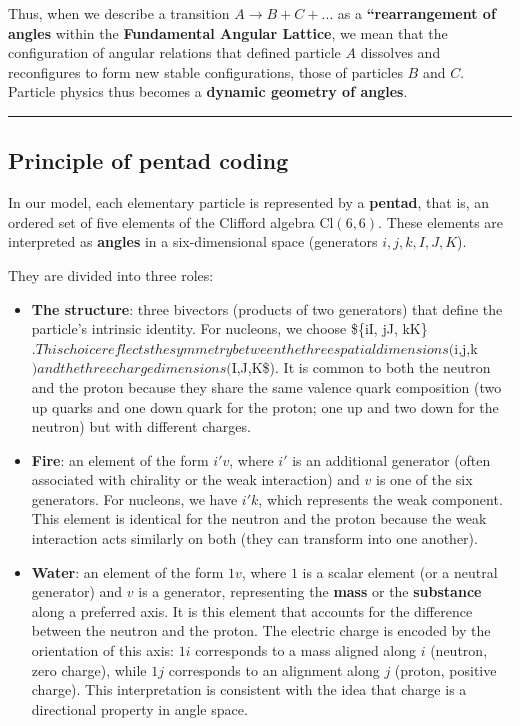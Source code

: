 \documentclass[11pt]{article}
\providecommand{\tightlist}{%
\setlength{\itemsep}{2pt}\setlength{\parskip}{6pt}
}
\begin{document}
Thus, when we describe a transition \(A \to B + C + \dots\) as a
\textbf{``rearrangement of angles} within the \textbf{Fundamental
Angular Lattice}, we mean that the configuration of angular relations
that defined particle \(A\) dissolves and reconfigures to form new
stable configurations, those of particles \(B\) and \(C\). Particle
physics thus becomes a \textbf{dynamic geometry of angles}.

\begin{center}\rule{0.5\linewidth}{0.5pt}\end{center}

\hypertarget{principle-of-pentad-coding}{%
\subsection{Principle of pentad
coding}\label{principle-of-pentad-coding}}

In our model, each elementary particle is represented by a
\textbf{pentad}, that is, an ordered set of five elements of the
Clifford algebra \(\text{Cl}(6,6)\). These elements are interpreted as
\textbf{angles} in a six-dimensional space (generators \(i,j,k,I,J,K\)).

They are divided into three roles:

\begin{itemize}
\tightlist
\item
  \textbf{The structure}: three bivectors (products of two generators)
  that define the particle's intrinsic identity. For nucleons, we choose
  \$\{iI, jJ, kK\}
  \(. This choice reflects the symmetry between the three spatial dimensions (\)i,j,k\() and the three charge dimensions (\)I,J,K\$).
  It is common to both the neutron and the proton because they share the
  same valence quark composition (two up quarks and one down quark for
  the proton; one up and two down for the neutron) but with different
  charges.
\item
  \textbf{Fire}: an element of the form \(i'v\), where \(i'\) is an
  additional generator (often associated with chirality or the weak
  interaction) and \(v\) is one of the six generators. For nucleons, we
  have \(i'k\), which represents the weak component. This element is
  identical for the neutron and the proton because the weak interaction
  acts similarly on both (they can transform into one another).
\item
  \textbf{Water}: an element of the form \(1v\), where \(1\) is a scalar
  element (or a neutral generator) and \(v\) is a generator,
  representing the \textbf{mass} or the \textbf{substance} along a
  preferred axis. It is this element that accounts for the difference
  between the neutron and the proton. The electric charge is encoded by
  the orientation of this axis: \(1i\) corresponds to a mass aligned
  along \(i\) (neutron, zero charge), while \(1j\) corresponds to an
  alignment along \(j\) (proton, positive charge). This interpretation
  is consistent with the idea that charge is a directional property in
  angle space.
\end{itemize}
\end{document}
